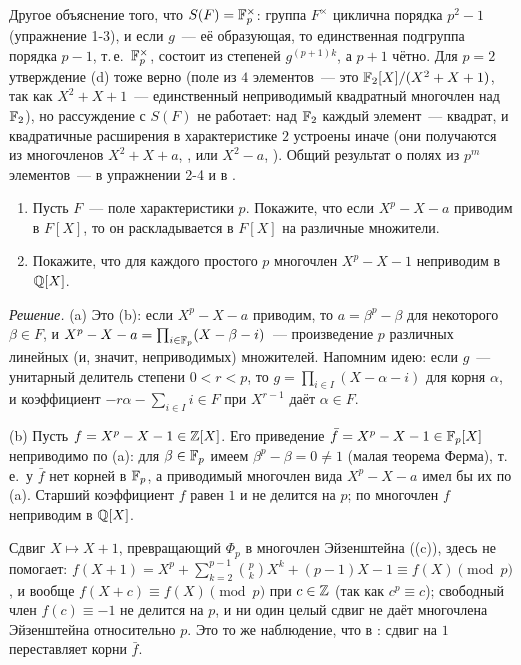 Другое объяснение того, что $S(F)=\mathbb F_p^\times$: группа $F^\times$ циклична порядка $p^2-1$ (упражнение 1-3), и если
$g$~--- её образующая, то единственная подгруппа порядка $p-1$, т.\,е.\ $\mathbb F_p^\times$, состоит из степеней $g^{(p+1)k}$, а
$p+1$ чётно. Для $p=2$ утверждение (d) тоже верно (поле из $4$ элементов~--- это $\mathbb F_2[X]/(X^2+X+1)$, так как
$X^2+X+1$~--- единственный неприводимый квадратный многочлен над $\mathbb F_2$), но рассуждение с $S(F)$ не работает: над $\mathbb F_2$
каждый элемент~--- квадрат, и квадратичные расширения в характеристике $2$ устроены иначе (они получаются из многочленов
$X^2+X+a$, , или $X^2-a$, ). Общий результат о полях из $p^m$ элементов~--- в упражнении 2-4 и в
.

\begin{exercise}[2-2]
\begin{enumerate}[label=(\alph*)]
\item Пусть $F$~--- поле характеристики $p$. Покажите, что если $X^p-X-a$ приводим в $F[X]$, то он раскладывается в
$F[X]$ на различные множители.
\item Покажите, что для каждого простого $p$ многочлен $X^p-X-1$ неприводим в $\mathbb Q[X]$.
\end{enumerate}
\end{exercise}

\noindent\emph{Решение.} (a) Это (b): если $X^p-X-a$ приводим, то $a=\beta^p-\beta$ для некоторого $\beta\in F$,
и $X^p-X-a=\prod_{i\in\mathbb F_p}(X-\beta-i)$~--- произведение $p$ различных линейных (и, значит, неприводимых) множителей.
Напомним идею: если $g$~--- унитарный делитель степени $0<r<p$, то $g=\prod_{i\in I}(X-\alpha-i)$ для корня $\alpha$, и
коэффициент $-r\alpha-\sum_{i\in I}i\in F$ при $X^{r-1}$ даёт $\alpha\in F$.

(b) Пусть $f=X^p-X-1\in\mathbb Z[X]$. Его приведение $\bar f=X^p-X-1\in\mathbb F_p[X]$ неприводимо по (a): для $\beta\in\mathbb F_p$ имеем
$\beta^p-\beta=0\ne1$ (малая теорема Ферма), т.\,е.\ у $\bar f$ нет корней в $\mathbb F_p$, а приводимый многочлен вида
$X^p-X-a$ имел бы их по (a). Старший коэффициент $f$ равен $1$ и не делится на $p$; по  многочлен $f$ неприводим
в $\mathbb Q[X]$.

Сдвиг $X\mapsto X+1$, превращающий $\Phi_p$ в многочлен Эйзенштейна ((c)), здесь не помогает:
$f(X+1)=X^p+\sum_{k=2}^{p-1}\binom pkX^k+(p-1)X-1\equiv f(X)\pmod p$, и вообще $f(X+c)\equiv f(X)\pmod p$ при $c\in\mathbb Z$
(так как $c^p\equiv c$); свободный член $f(c)\equiv-1$ не делится на $p$, и ни один целый сдвиг не даёт многочлена
Эйзенштейна относительно $p$. Это то же наблюдение, что в :
сдвиг на $1$ переставляет корни $\bar f$.

